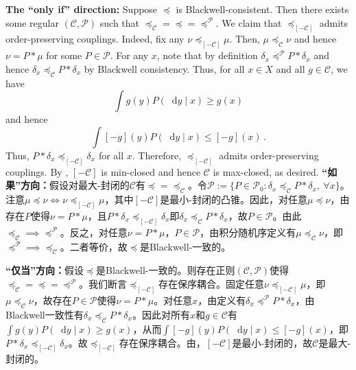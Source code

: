 \documentclass[12pt,letterpaper]{article}
\makeatletter
\newenvironment{original}{\color{black}}{}
\newenvironment{translation}{\color{blue}}{}
\theoremstyle{plain}
\theoremstyle{definition}
\renewenvironment{proof}[1][\proofname]{
  \par\pushQED{\qed}\normalfont
  \topsep6\p@\@plus6\p@\relax
  \trivlist\item[\hskip\labelsep\bfseries#1\@addpunct{.}]
  \ignorespaces
}{
  \popQED\endtrivlist\@endpefalse
}
\theoremstyle{remark}
\newcommand{\Pc}{\mathcal{P}}
\newcommand{\C}{\mathcal{C}}
\renewcommand*\d{\mathop{}\!\mathrm{d}}
\theoremstyle{definition}
\makeatother
\begin{document}
\begin{proof}[Proof of \Cref{thm:main2}]
\begin{original}
\textbf{The ``only if'' direction:} Suppose $\preceq$ is Blackwell-consistent. Then there exists some regular $(\C, \Pc)$ such that $\preceq_\C = \preceq = \preceq^\Pc$. We claim that $\preceq_{[-\C]}$ admits order-preserving couplings. Indeed, fix any $\nu \preceq_{[-\C]} \mu$. Then, $\mu \preceq_{\C} \nu$ and hence $\nu = P * \mu$ for some $P \in \Pc$. For any $x$, note that by definition $\delta_x \preceq^{\Pc} P * \delta_x$ and hence $\delta_x \preceq_\C P * \delta_x$ by Blackwell consistency. Thus, for all $x \in X$ and all $g \in \C$, we have
\[\int g(y) P(\d y\mid x) \geq g(x)\]
and hence
\[\int [-g](y) P(\d y\mid x) \leq [-g](x)\,.\]
Thus, $P * \delta_x \preceq_{[-\C]} \delta_x$ for all $x$. Therefore, $\preceq_{[-\C]}$ admits order-preserving couplings. By , $[-\C]$ is min-closed and hence $\C$ is max-closed, as desired.
\end{original}
\begin{translation}
\textbf{``如果''方向：}假设对最大-封闭的$\C$有$\preceq = \preceq_\C$。令$\Pc := \{P \in \Pc_0: \delta_x \preceq_\C P *\delta_x,\ \forall x\}$。注意$\mu\preceq \nu \iff \nu \preceq_{[-\C]} \mu$，其中$[-\C]$是最小-封闭的凸锥。因此，对任意$\mu\preceq \nu$，由存在$P$使得$\nu = P * \mu$，且$P * \delta_x \preceq_{[-\C]} \delta_x$即$\delta_x \preceq_{\C} P * \delta_x$，故$P \in \Pc$。由此$\preceq_\C \implies \preceq^\Pc$。反之，对任意$\nu = P * \mu$，$P \in \Pc$，由积分随机序定义有$\mu \preceq_\C \nu$，即$\preceq^\Pc \implies \preceq_\C$。二者等价，故$\preceq$是Blackwell-一致的。

\textbf{``仅当''方向：}假设$\preceq$是Blackwell-一致的。则存在正则$(\C, \Pc)$使得$\preceq_\C = \preceq = \preceq^\Pc$。我们断言$\preceq_{[-\C]}$存在保序耦合。固定任意$\nu \preceq_{[-\C]} \mu$，即$\mu \preceq_{\C} \nu$，故存在$P \in \Pc$使得$\nu = P * \mu$。对任意$x$，由定义有$\delta_x \preceq^{\Pc} P * \delta_x$，由Blackwell一致性有$\delta_x \preceq_\C P * \delta_x$。因此对所有$x$和$g \in \C$有$\int g(y) P(\d y\mid x) \geq g(x)$，从而$\int [-g](y) P(\d y\mid x) \leq [-g](x)$，即$P * \delta_x \preceq_{[-\C]} \delta_x$。故$\preceq_{[-\C]}$存在保序耦合。由，$[-\C]$是最小-封闭的，故$\C$是最大-封闭的。
\end{translation}
\end{proof}
\end{document}
